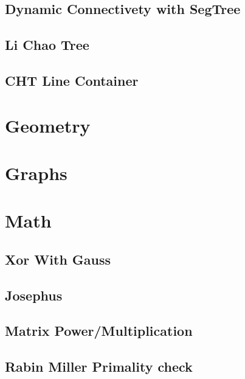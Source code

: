 \subsection{Dynamic Connectivety with SegTree}
\raggedbottom
\hrulefill
\subsection{Li Chao Tree}
\raggedbottom
\hrulefill
\subsection{CHT Line Container}
\raggedbottom
\hrulefill

\section{Geometry}

\section{Graphs}

\section{Math}
\subsection{Xor With Gauss}
\raggedbottom
\hrulefill
\subsection{Josephus}
\raggedbottom
\hrulefill
\subsection{Matrix Power/Multiplication}
\raggedbottom
\hrulefill
\subsection{Rabin Miller Primality check}
\raggedbottom
\hrulefill

